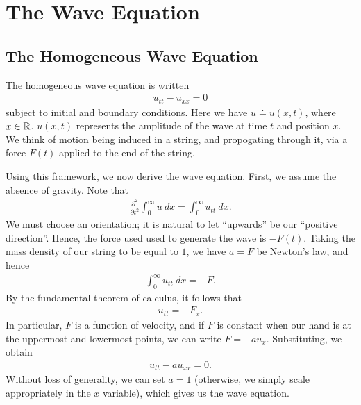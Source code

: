 \chapter{The Wave Equation}
\section{The Homogeneous Wave Equation}
The homogeneous wave equation is written
\begin{equation*}
\begin{split}
	u_{tt} - u_{xx} = 0
\end{split}
\end{equation*}
subject to initial and boundary conditions. Here we have $u\doteq u(x,t)$,
where $x \in \mathbb{R}$. $u(x,t)$ represents the amplitude of the wave at time $t$ and
position $x$. We think of motion being induced in a string, and propogating
through it, via a force $F(t)$ applied to the end of the string.

Using this framework, we now derive the wave equation. First, we assume the
absence of gravity. Note that
\begin{equation*}
\begin{split}
	\frac{\partial^{2}}{\partial t^{2}} \int_{0}^{\infty} u \ dx =
	\int_{0}^{\infty} u_{tt} \ dx.
\end{split}
\end{equation*}
We must choose an orientation; it is natural to let ``upwards'' be our
``positive direction''. Hence, the force used used to generate the wave is
$-F(t)$. Taking the mass density of our string to be equal to $1$, we have
$a = F$ be Newton's law, and hence
\begin{equation*}
\begin{split}
	\int_{0}^{\infty} u_{tt} \ dx = -F.
\end{split}
\end{equation*}
By the fundamental theorem of calculus, it follows that
\begin{equation*}
\begin{split}
	u_{tt} = -F_{x}.
\end{split}
\end{equation*}
In particular, $F$ is a function of velocity, and if $F$ is constant when our
hand is at the uppermost and lowermost points, we can write
$F = -a u_{x}$. Substituting, we obtain
\begin{equation*}
\begin{split}
	u_{tt} - au_{xx} = 0.
\end{split}
\end{equation*}
Without loss of generality, we can set $a = 1$ (otherwise, we simply scale
appropriately in the $x$ variable), which gives us the wave equation.
